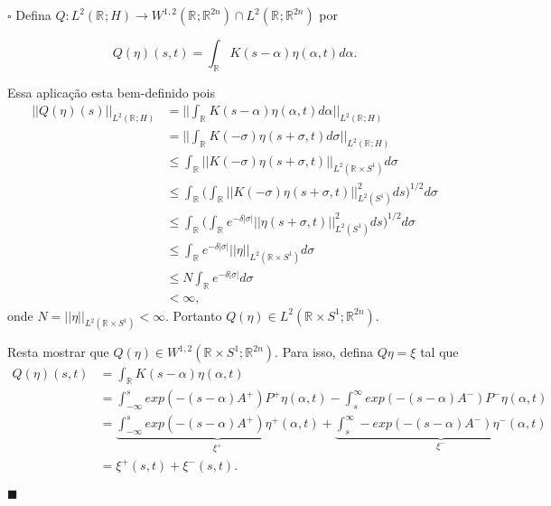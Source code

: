\documentclass[12pt]{book}
\newenvironment{prova}[1]{$\square$ #1}{\hfill$\blacksquare$}
\newcommand{\circulo}{S^{1}}
\newcommand{\espacoLdois}[1]{L^{2}(#1)}
\newcommand{\espacoLpGeral}[2]{L^{#1}(#2)}
\newcommand{\espacosobolevgeral}[2]{W^{1,#1}(#2)}
\newcommand{\norma}[1]{||#1||}
\newcommand{\normagrande}[1]{\Big|\Big|#1\Big|\Big|}
\newcommand{\retacartesianocirculo}{\real{} \times \circulo}
\newcommand{\real}[1]{\mathbb{R}^{#1}}
\newcommand{\reta}{\real{}}
\begin{document}
\begin{prova}
		Defina $Q: \espacoLdois{\real{};H} \to \espacosobolevgeral{2}{\reta;\real{2n}}\cap \espacoLpGeral{2}{\reta;\real{2n}}$ por
		
		
		$$
		Q(\eta)(s,t) = \int_{\real{}}K(s-\alpha)\eta(\alpha, t)d\alpha.
		$$
		
		Essa aplicação esta bem-definido pois
		$$
		\begin{aligned}
		\norma{Q(\eta)(s)}_{\espacoLpGeral{2}{\reta;H}} &= \normagrande{\int_{\real{}}K(s-\alpha)\eta(\alpha, t)d\alpha}_{\espacoLpGeral{2}{\reta;H}}
		\\
		&= \normagrande{\int_{\real{}}K(-\sigma)\eta(s+\sigma, t)d\sigma}_{\espacoLpGeral{2}{\reta;H}}
		\\
		&\leq
		\int_{\reta}\norma{K(-\sigma)\eta(s+\sigma, t)}_{\espacoLpGeral{2}{\retacartesianocirculo}}d\sigma
		\\
		&\leq
		\int_{\reta}\Big(\int_{\reta} \norma{K(-\sigma)\eta(s+\sigma, t)}_{\espacoLdois{\circulo}}^{2}ds\Big)^{1/2}d\sigma
		\\
		&\leq
		\int_{\reta}\Big(\int_{\reta}e^{-\delta|\sigma|} \norma{\eta(s+\sigma, t)}_{\espacoLdois{\circulo}}^{2}ds\Big)^{1/2}d\sigma
		\\
		&\leq
		\int_{\reta}e^{-\delta|\sigma|}\norma{\eta}_{\espacoLdois{\retacartesianocirculo}}d\sigma
		\\
		&\leq N\int_{\reta}e^{-\delta|\sigma|}d\sigma
		\\
		&< \infty,	
		\end{aligned}
		$$
		onde $N=\norma{\eta}_{\espacoLdois{\retacartesianocirculo}}
		<\infty$. Portanto $Q(\eta) \in \espacoLdois{\retacartesianocirculo;\real{2n}}$. 
		
		Resta mostrar que $Q(\eta) \in \espacosobolevgeral{2}{\retacartesianocirculo;\real{2n}}$. Para isso, defina $Q\eta = \xi$ tal que
		$$
		\begin{aligned}
		Q(\eta)(s,t) 
		&= \int_{\reta}K(s-\alpha)\eta(\alpha,t)
		\\
		&=\int_{-\infty}^{s}exp(-(s-\alpha)A^{+})P^{+}\eta(\alpha,t)-\int_{s}^{\infty}exp(-(s-\alpha)A^{-})P^{-}\eta(\alpha,t)
		\\
		&=\underbrace{\int_{-\infty}^{s}exp(-(s-\alpha)A^{+})\eta^{+}(\alpha,t)}_{\xi^{+}} +\underbrace{\int_{s}^{\infty}-exp(-(s-\alpha)A^{-})\eta^{-}(\alpha,t)}_{\xi^{-}}
		\\
		&= \xi^{+}(s,t)+\xi^{-}(s,t).
		\end{aligned}
		$$
		

\end{prova}
\end{document}
